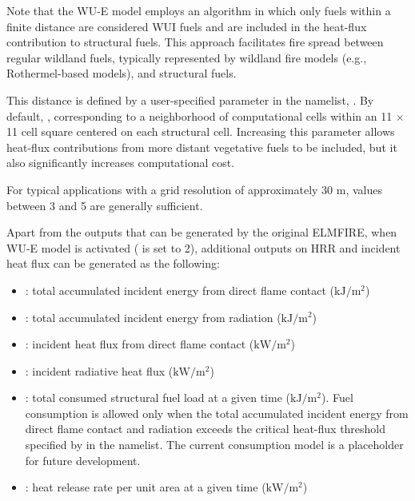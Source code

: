 Note that the WU-E model employs an algorithm in which only fuels within a finite distance are considered WUI fuels and are included in the heat-flux contribution to structural fuels. This approach facilitates fire spread between regular wildland fuels, typically represented by wildland fire models (e.g., Rothermel-based models), and structural fuels.

This distance is defined by a user-specified parameter in the  namelist, . By default, , corresponding to a neighborhood of computational cells within an 11 \(\times\) 11 cell square centered on each structural cell. Increasing this parameter allows heat-flux contributions from more distant vegetative fuels to be included, but it also significantly increases computational cost.

For typical applications with a grid resolution of approximately 30 m,  values between 3 and 5 are generally sufficient.

Apart from the outputs that can be generated by the original ELMFIRE, when WU-E model is activated ( is set to 2), additional outputs on HRR and incident heat flux can be generated as the following:

\begin{itemize}
    \item {}: total accumulated incident energy from direct flame contact ($\mathrm{kJ}/\mathrm{m}^2$)
    \item {}: total accumulated incident energy from radiation ($\mathrm{kJ}/\mathrm{m}^2$)
    \item {}: incident heat flux from direct flame contact ($\mathrm{kW}/\mathrm{m}^2$)
    \item {}: incident radiative heat flux ($\mathrm{kW}/\mathrm{m}^2$)
    \item {}: total consumed structural fuel load at a given time ($\mathrm{kJ}/\mathrm{m}^2$). Fuel consumption is allowed only when the total accumulated incident energy from direct flame contact and radiation exceeds the critical heat-flux threshold specified by  in the  namelist. The current consumption model is a placeholder for future development.
    \item {}: heat release rate per unit area at a given time ($\mathrm{kW}/\mathrm{m}^2$)
\end{itemize}

